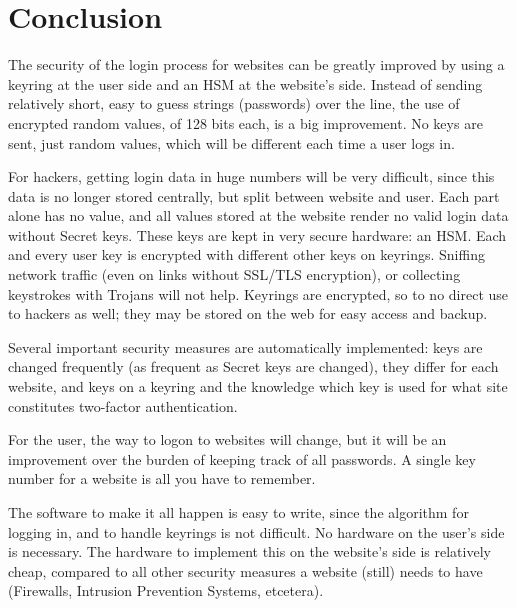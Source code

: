 \section{Conclusion}
The security of the login process for websites can be greatly improved by using a keyring at the user side and an HSM at the website's side.
Instead of sending relatively short, easy to guess strings (passwords) over the line,
the use of encrypted random values,
of 128 bits each,
is a big improvement.
No keys are sent,
just random values,
which will be different each time a user logs in.
\par
For hackers,
getting login data in huge numbers will be very difficult,
since this data is no longer stored centrally,
but split between website and user.
Each part alone has no value,
and all values stored at the website render no valid login data without Secret keys.
These keys are kept in very secure hardware: an HSM.
Each and every user key is encrypted with different other keys on keyrings.
Sniffing network traffic
(even on links without SSL/TLS encryption),
or collecting keystrokes with Trojans will not help.
Keyrings are encrypted,
so to no direct use to hackers as well;
they may be stored on the web for easy access and backup.
\par
Several important security measures are automatically implemented:
keys are changed frequently
(as frequent as Secret keys are changed),
they differ for each website,
and keys on a keyring and the knowledge which key is used for what site constitutes two-factor authentication.
\par
For the user,
the way to logon to websites will change,
but it will be an improvement over the burden of keeping track of all passwords.
A single key number for a website is all you have to remember.
\par
The software to make it all happen is easy to write,
since the algorithm for logging in,
and to handle keyrings is not difficult.
No hardware on the user's side is necessary.
The hardware to implement this on the website's side is relatively cheap,
compared to all other security measures a website (still) needs to have
(Firewalls, Intrusion Prevention Systems, etcetera).
